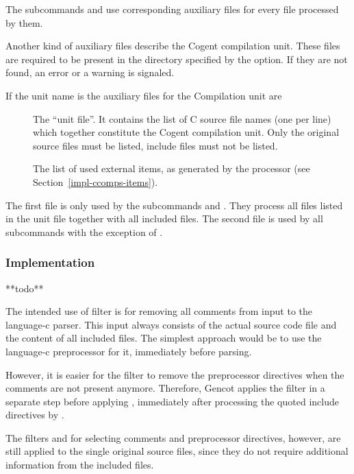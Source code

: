 The subcommands  and  use corresponding auxiliary files for every file  processed by them.

Another kind of auxiliary files describe the Cogent compilation unit. These files are required to be present 
in the directory specified by the  option. If they are not found, an error or a warning is signaled.

If the unit name is  the auxiliary files for the Compilation unit are
\begin{description}
\item[] The ``unit file''. It contains the list of C source file names
(one per line) which together constitute the Cogent compilation unit. Only the original source files  must 
be listed, include files  must not be listed.
\item[] The list of used external items, as generated by the processor 
(see Section~\ref{impl-ccomps-items}).
\end{description}

The first file is only used by the subcommands  and . They process all files listed in the unit file
together with all included files. The second file is used by all  subcommands with the exception of .

\subsubsection{Implementation}

**todo**

The intended use of filter  is for removing all comments from input to the language-c parser.
This input always consists of the actual source code file and the content of all included files. The simplest approach
would be to use the language-c preprocessor for it, immediately before parsing. 

However, it is easier for the filter  to remove the preprocessor directives when the comments are 
not present anymore. Therefore, Gencot applies the filter  in a separate step before applying
, immediately after processing the quoted include directives by .
 
The filters  and  for selecting comments and preprocessor directives, however, are
still applied to the single original source files, since they do not require additional information from the included files.


